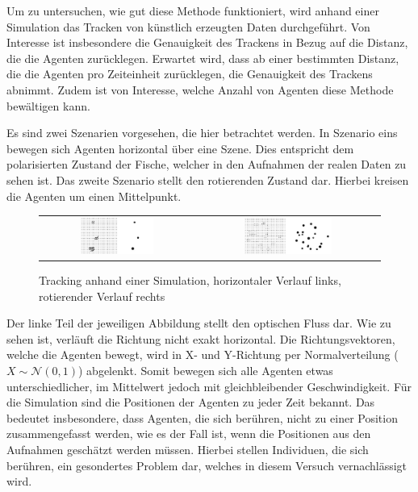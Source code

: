 Um zu untersuchen, wie gut diese Methode funktioniert, wird anhand einer Simulation das Tracken von künstlich erzeugten Daten durchgeführt. Von Interesse ist insbesondere die Genauigkeit des Trackens in Bezug auf die Distanz, die die Agenten zurücklegen. Erwartet wird, dass ab einer bestimmten Distanz, die die Agenten pro Zeiteinheit zurücklegen, die Genauigkeit des Trackens abnimmt. Zudem ist von Interesse, welche Anzahl von Agenten diese Methode bewältigen kann.

Es sind zwei Szenarien vorgesehen, die hier betrachtet werden. In Szenario eins bewegen sich Agenten horizontal über eine Szene. Dies entspricht dem polarisierten Zustand der Fische, welcher in den Aufnahmen der realen Daten zu sehen ist. Das zweite Szenario stellt den rotierenden Zustand dar. Hierbei kreisen die Agenten um einen Mittelpunkt.


\begin{figure}[H]
\centering
\begin{tabular}{cc}
\includegraphics[width=0.5\textwidth]{figures/Experimente/Tracking/Tracking Studie.jpeg} & \includegraphics[width=0.5\textwidth]{figures/Experimente/Tracking/Tracking Studie Milling.jpeg}

\end{tabular}
\caption{Tracking anhand einer Simulation, horizontaler Verlauf links, rotierender Verlauf rechts\label{fig:TrackingEigen}  }
\end{figure}

Der linke Teil der jeweiligen Abbildung stellt den optischen Fluss dar. Wie zu sehen ist, verläuft die Richtung nicht exakt horizontal. Die Richtungsvektoren, welche die Agenten bewegt, wird in X- und Y-Richtung per Normalverteilung ($X \sim \mathcal{N}(0,1) $) abgelenkt. Somit bewegen sich alle Agenten etwas unterschiedlicher, im Mittelwert jedoch mit gleichbleibender Geschwindigkeit. Für die Simulation sind die Positionen der Agenten zu jeder Zeit bekannt. Das bedeutet insbesondere, dass Agenten, die sich berühren, nicht zu einer Position zusammengefasst werden, wie es der Fall ist, wenn die Positionen aus den Aufnahmen geschätzt werden müssen. Hierbei stellen Individuen, die sich berühren, ein gesondertes Problem dar, welches in diesem Versuch vernachlässigt wird.

